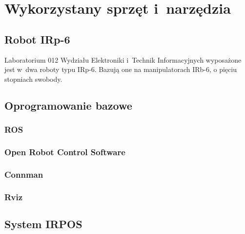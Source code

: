 
\chapter{Wykorzystany sprzęt i~narzędzia}
\label{ch:sprzęt_i_narzędzia}

	\section{Robot IRp-6}
	\label{s:robot_irp6}
	Laboratorium 012 Wydziału Elektroniki i~Technik Informacyjnych wyposażone jest w~dwa roboty typu IRp-6. Bazują one na manipulatorach IRb-6, o pięciu stopniach swobody\cite{merapiap}.
	
		\section{Oprogramowanie bazowe}
		\label{s:oprogramowanie_baz}
			\subsection{ROS}
			\label{ss:ros2}
			\subsection{Open Robot Control Software }
			\label{ss:orocos}
			\subsection{Connman}
			\label{ss:connman}
			\subsection{Rviz}
			\label{ss:rviz}
		\section{System IRPOS}
		\label{s:irpos}
